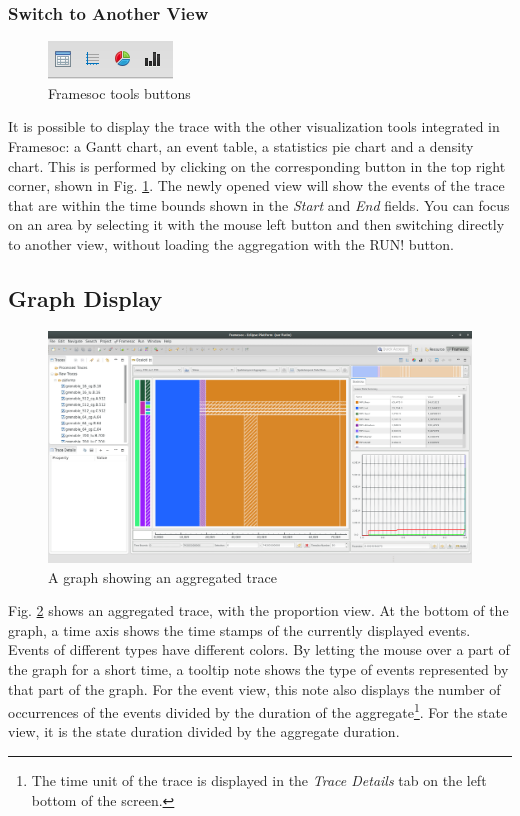 \documentclass[twoside]{article}
\begin{document}
\begin{sloppypar}
\subsubsection{Switch to Another View}
\begin{figure}[h!]
	\centering
	\includegraphics[scale=1.0]{images/framesoc_buttons.png}
	\caption{Framesoc tools buttons}
	\label{framesocTools}
\end{figure}
It is possible to display the trace with the other visualization tools integrated in Framesoc: a Gantt chart, an event table, a statistics pie chart and a density chart. This is performed by clicking on the corresponding button in the top right corner, shown in Fig. \ref{framesocTools}. The newly opened view will show the events of the trace that are within the time bounds shown in the \textit{Start} and \textit{End} fields. You can focus on an area by selecting it with the mouse left button and then switching directly to another view, without loading the aggregation with the RUN! button. 

\subsection{Graph Display}
\begin{figure}[h!]
	\centering
	\includegraphics[width=1.0\textwidth]{images/ocelotlAggregated.png}
	\caption{A graph showing an aggregated trace}
	\label{showAggreg}
\end{figure}

Fig. \ref{showAggreg} shows an aggregated trace, with the proportion view. At the bottom of the graph, a time axis shows the time stamps of the currently displayed events. Events of different types have different colors. By letting the mouse over a part of the graph for a short time, a tooltip note shows the type of events represented by that part of the graph. For the event view, this note also displays the number of occurrences of the events divided by the duration of the aggregate\footnote{The time unit of the trace is displayed in the \textit{Trace Details} tab on the left bottom of the screen.}. For the state view, it is the state duration divided by the aggregate duration.


\end{sloppypar}
\end{document}
